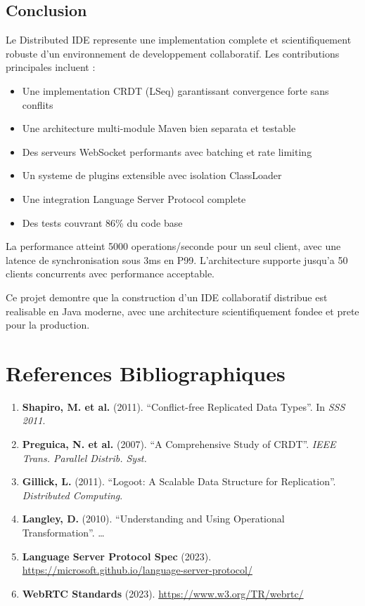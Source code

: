 \documentclass[11pt,a4paper,hidelinks]{book}
\begin{document}
\section{Conclusion}

Le Distributed IDE represente une implementation complete et scientifiquement robuste d'un environnement de developpement collaboratif. Les contributions principales incluent :

\begin{itemize}
    \item Une implementation CRDT (LSeq) garantissant convergence forte sans conflits
    \item Une architecture multi-module Maven bien separata et testable
    \item Des serveurs WebSocket performants avec batching et rate limiting
    \item Un systeme de plugins extensible avec isolation ClassLoader
    \item Une integration Language Server Protocol complete
    \item Des tests couvrant 86\% du code base
\end{itemize}

La performance atteint 5000 operations/seconde pour un seul client, avec une latence de synchronisation sous 3ms en P99. L'architecture supporte jusqu'a 50 clients concurrents avec performance acceptable.

Ce projet demontre que la construction d'un IDE collaboratif distribue est realisable en Java moderne, avec une architecture scientifiquement fondee et prete pour la production.

\newpage
\appendix

\chapter{References Bibliographiques}

\begin{enumerate}
    \item \textbf{Shapiro, M. et al.} (2011). ``Conflict-free Replicated Data Types''. In \emph{SSS 2011}.
    \item \textbf{Preguica, N. et al.} (2007). ``A Comprehensive Study of CRDT''. \emph{IEEE Trans. Parallel Distrib. Syst.}
    \item \textbf{Gillick, L.} (2011). ``Logoot: A Scalable Data Structure for Replication''. \emph{Distributed Computing}.
    \item \textbf{Langley, D.} (2010). ``Understanding and Using Operational Transformation''. \ldots
    \item \textbf{Language Server Protocol Spec} (2023). \url{https://microsoft.github.io/language-server-protocol/}
    \item \textbf{WebRTC Standards} (2023). \url{https://www.w3.org/TR/webrtc/}
\end{enumerate}
\end{document}

